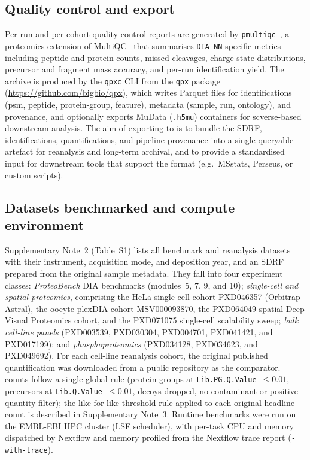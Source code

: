 \documentclass[preprint,12pt]{elsarticle}
\begin{document}
\subsection{Quality control and \qpx{} export}
Per-run and per-cohort quality control reports are generated by \texttt{pmultiqc}~\cite{yue2026pmultiqc}, a proteomics extension of MultiQC~\cite{ewels2016multiqc} that summarises \texttt{DIA-NN}-specific metrics including peptide and protein counts, missed cleavages, charge-state distributions, precursor and fragment mass accuracy, and per-run identification yield. The \qpx{} archive is produced by the \texttt{qpxc} CLI from the \texttt{qpx} package (\url{https://github.com/bigbio/qpx}), which writes Parquet files for identifications (psm, peptide, protein-group, feature), metadata (sample, run, ontology), and provenance, and optionally exports MuData (\texttt{.h5mu}) containers for scverse-based~\cite{virshup2023scverse} downstream analysis. The aim of exporting to \qpx{} is to bundle the SDRF, identifications, quantifications, and pipeline provenance into a single queryable artefact for reanalysis and long-term archival, and to provide a standardised input for downstream tools that support the format (e.g.\ MSstats, Perseus, or custom scripts).

\subsection{Datasets benchmarked and compute environment}
\label{sec:datasets}
Supplementary Note~2 (Table~S1) lists all benchmark and reanalysis datasets with their instrument, acquisition mode, and deposition year, and an SDRF prepared from the original sample metadata. They fall into four experiment classes: \emph{ProteoBench} DIA benchmarks (modules~5, 7, 9, and 10); \emph{single-cell and spatial proteomics}, comprising the HeLa single-cell cohort PXD046357 (Orbitrap Astral), the oocyte plexDIA cohort MSV000093870, the PXD064049 spatial Deep Visual Proteomics cohort, and the PXD071075 single-cell scalability sweep; \emph{bulk cell-line panels} (PXD003539, PXD030304, PXD004701, PXD041421, and PXD017199); and \emph{phosphoproteomics} (PXD034128, PXD034623, and PXD049692).
For each cell-line reanalysis cohort, the original published quantification was downloaded from a public repository as the comparator. \quantmsdiann{} counts follow a single global rule (protein groups at \texttt{Lib.PG.Q.Value}~$\leq 0.01$, precursors at \texttt{Lib.Q.Value}~$\leq 0.01$, decoys dropped, no contaminant or positive-quantity filter); the like-for-like-threshold rule applied to each original headline count is described in Supplementary Note~3. Runtime benchmarks were run on the EMBL-EBI HPC cluster (LSF scheduler), with per-task CPU and memory dispatched by Nextflow and memory profiled from the Nextflow trace report (\texttt{-with-trace}).
\end{document}
